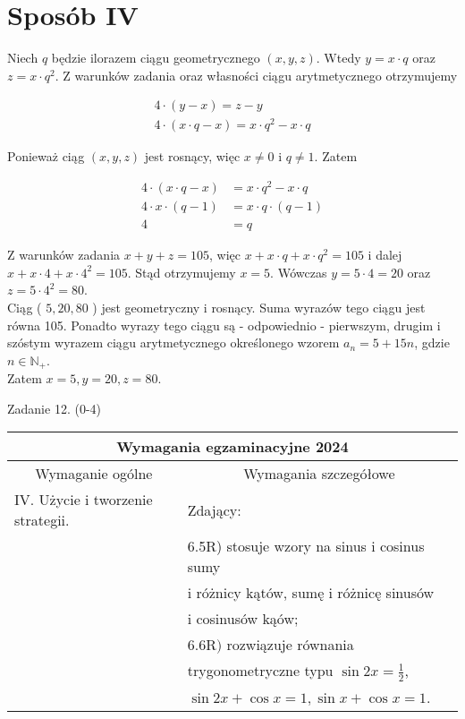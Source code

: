 \documentclass[10pt]{article}
\begin{document}
\section*{Sposób IV}
Niech $q$ będzie ilorazem ciągu geometrycznego $(x, y, z)$. Wtedy $y=x \cdot q$ oraz $z=x \cdot q^{2}$. Z warunków zadania oraz własności ciągu arytmetycznego otrzymujemy

$$
\begin{gathered}
4 \cdot(y-x)=z-y \\
4 \cdot(x \cdot q-x)=x \cdot q^{2}-x \cdot q
\end{gathered}
$$

Ponieważ ciąg $(x, y, z)$ jest rosnący, więc $x \neq 0$ i $q \neq 1$. Zatem

$$
\begin{aligned}
4 \cdot(x \cdot q-x) & =x \cdot q^{2}-x \cdot q \\
4 \cdot x \cdot(q-1) & =x \cdot q \cdot(q-1) \\
4 & =q
\end{aligned}
$$

Z warunków zadania $x+y+z=105$, więc $x+x \cdot q+x \cdot q^{2}=105$ i dalej $x+x \cdot 4+x \cdot 4^{2}=105$. Stąd otrzymujemy $x=5$. Wówczas $y=5 \cdot 4=20$ oraz $z=5 \cdot 4^{2}=80$.\\
Ciąg ( $5,20,80$ ) jest geometryczny i rosnący. Suma wyrazów tego ciągu jest równa 105. Ponadto wyrazy tego ciągu są - odpowiednio - pierwszym, drugim i szóstym wyrazem ciągu arytmetycznego określonego wzorem $a_{n}=5+15 n$, gdzie $n \in \mathbb{N}_{+}$.\\
Zatem $x=5, y=20, z=80$.

Zadanie 12. (0-4)

\begin{center}
\begin{tabular}{|l|l|}
\hline
\multicolumn{2}{|c|}{Wymagania egzaminacyjne 2024} \\
\hline
\multicolumn{1}{|c|}{Wymaganie ogólne} & \multicolumn{1}{c|}{Wymagania szczegółowe} \\
\hline
IV. Użycie i tworzenie strategii. & Zdający: \\
 & 6.5R) stosuje wzory na sinus i cosinus sumy \\
 & i różnicy kątów, sumę i różnicę sinusów \\
 & i cosinusów kąów; \\
 & $6.6 \mathrm{R})$ rozwiązuje równania \\
 & trygonometryczne typu $\sin 2 x=\frac{1}{2}$, \\
 & $\sin 2 x+\cos x=1, \sin x+\cos x=1$. \\
\hline
\end{tabular}
\end{center}
\end{document}
